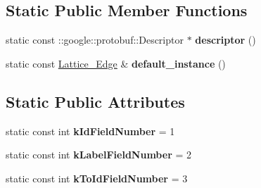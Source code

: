 \subsection*{Static Public Member Functions}
\begin{DoxyCompactItemize}
\item 
\hypertarget{classlattice_1_1Lattice__Edge_adfaf5f1cd736f992737dee1ccdcb51e6}{
static const ::google::protobuf::Descriptor $\ast$ {\bfseries descriptor} ()}
\label{classlattice_1_1Lattice__Edge_adfaf5f1cd736f992737dee1ccdcb51e6}

\item 
\hypertarget{classlattice_1_1Lattice__Edge_ad6199d71162f268106f19c8b57141790}{
static const \hyperlink{classlattice_1_1Lattice__Edge}{Lattice\_\-Edge} \& {\bfseries default\_\-instance} ()}
\label{classlattice_1_1Lattice__Edge_ad6199d71162f268106f19c8b57141790}

\end{DoxyCompactItemize}
\subsection*{Static Public Attributes}
\begin{DoxyCompactItemize}
\item 
\hypertarget{classlattice_1_1Lattice__Edge_a0e2f2cee5173639eda89756b70265596}{
static const int {\bfseries kIdFieldNumber} = 1}
\label{classlattice_1_1Lattice__Edge_a0e2f2cee5173639eda89756b70265596}

\item 
\hypertarget{classlattice_1_1Lattice__Edge_a5c0b87e3bc9390f398cf3e2de0c19ca0}{
static const int {\bfseries kLabelFieldNumber} = 2}
\label{classlattice_1_1Lattice__Edge_a5c0b87e3bc9390f398cf3e2de0c19ca0}

\item 
\hypertarget{classlattice_1_1Lattice__Edge_a3bf87977ee5b7e5f33486c382fbac72f}{
static const int {\bfseries kToIdFieldNumber} = 3}
\label{classlattice_1_1Lattice__Edge_a3bf87977ee5b7e5f33486c382fbac72f}

\end{DoxyCompactItemize}
